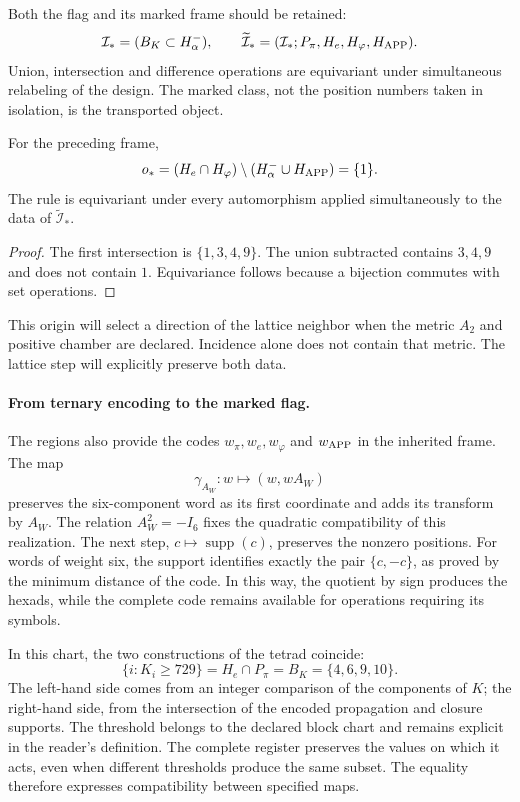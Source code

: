 Both the flag and its marked frame should be retained:
\[
 \mathcal I_*=(B_K\subset H^-_\alpha),\qquad
 \widetilde{\mathcal I}_*
   =(\mathcal I_*;P_\pi,H_e,H_\varphi,H_{\rm APP}).
\]
Union, intersection and difference operations are equivariant
under simultaneous relabeling of the design. The marked class, not the
position numbers taken in isolation, is the transported object.

\begin{lemma}
\label{x_reciprocidad:exc:origen}
For the preceding frame,
\[
 o_*=(H_e\cap H_\varphi)
           \setminus(H^-_\alpha\cup H_{\rm APP})=\{1\}.
\]
The rule is equivariant under every automorphism applied simultaneously
to the data of $\widetilde{\mathcal I}_*$.
\end{lemma}

\begin{proof}
The first intersection is $\{1,3,4,9\}$. The union subtracted
contains $3,4,9$ and does not contain $1$. Equivariance follows because a
bijection commutes with set operations.
\end{proof}

This origin will select a direction of the lattice neighbor when the
metric $A_2$ and positive chamber are declared. Incidence alone
does not contain that metric. The lattice step will explicitly preserve
both data.


\paragraph{From ternary encoding to the marked flag.}
\label{x_reciprocidad:inc-ampl-bandera}
The regions also provide the codes $w_\pi,w_e,w_\varphi$ and
$w_{\rm APP}$ in the inherited frame. The map
\[
 \gamma_{A_W}:w\longmapsto(w,wA_W)
\]
preserves the six-component word as its first coordinate and adds
its transform by $A_W$. The relation $A_W^2=-I_6$ fixes the
quadratic compatibility of this realization. The next step,
$c\mapsto\operatorname{supp}(c)$, preserves the nonzero positions.
For words of weight six, the support identifies exactly the pair
$\{c,-c\}$, as proved by the minimum distance of the code. In this way,
the quotient by sign produces the hexads, while the complete code
remains available for operations requiring its symbols.

In this chart, the two constructions of the tetrad coincide:
\begin{equation}
 \{i:K_i\geq729\}
 =H_e\cap P_\pi=B_K=\{4,6,9,10\}.
 \label{x_reciprocidad:inc-ampl-cuaterna}
\end{equation}
The left-hand side comes from an integer comparison of the components
of $K$; the right-hand side, from the intersection of the encoded propagation
and closure supports. The threshold belongs to the declared block
chart and remains explicit in the reader's definition. The
complete register preserves the values on which it acts, even when
different thresholds produce the same subset. The equality therefore
expresses compatibility between specified maps.

